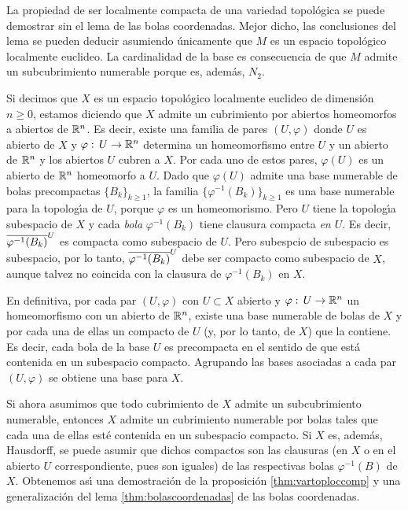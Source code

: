 \begin{remarkVarTopParacompIII}\label{rem:vartopparacompIII}
	La propiedad de ser localmente compacta de una variedad topol\'{o}gica
	se puede demostrar sin el lema de las bolas coordenadas. Mejor dicho,
	las conclusiones del lema se pueden deducir asumiendo \'{u}nicamente
	que $M$ es un espacio topol\'{o}gico localmente euclideo. La
	cardinalidad de la base es consecuencia de que $M$ admite un
	subcubrimiento numerable porque es, adem\'{a}s, $N_{2}$.

	Si decimos que $X$ es un espacio topol\'{o}gico localmente euclideo
	de dimensi\'{o}n $n\geq 0$, estamos diciendo que $X$ admite un
	cubrimiento por abiertos homeomorfos a abiertos de $\mathbb{R}^{n}$.
	Es decir, existe una familia de pares $(U,\varphi)$ donde
	$U$ es abierto de $X$ y $\varphi:\,U\rightarrow\mathbb{R}^{n}$ determina
	un homeomorfismo entre $U$ y un abierto de $\mathbb{R}^{n}$ y los
	abiertos $U$ cubren a $X$. Por cada uno de estos pares,
	$\varphi(U)$ es un abierto de $\mathbb{R}^{n}$ homeomorfo a $U$. Dado
	que $\varphi(U)$ admite una base numerable de bolas precompactas
	$\{B_{k}\}_{k\geq 1}$, la familia $\{\varphi^{-1}(B_{k})\}_{k\geq 1}$
	es una base numerable para la topolog\'{\i}a de $U$, porque $\varphi$
	es un homeomorismo. Pero $U$ tiene la topolog\'{\i}a subespacio
	de $X$ y cada \emph{bola} $\varphi^{-1}(B_{k})$ tiene clausura
	compacta \emph{en $U$}. Es decir, $\overline{\varphi^{-1}(B_{k})}^{U}$
	es compacta como subespacio de $U$. Pero subespcio de subespacio
	es subespacio, por lo tanto, $\overline{\varphi^{-1}(B_{k})}^{U}$ debe ser
	compacto como subespacio de $X$, aunque talvez no coincida con la
	clausura de $\varphi^{-1}(B_{k})$ en $X$.

	En definitiva, por cada par $(U,\varphi)$ con $U\subset X$ abierto
	y $\varphi:\,U\rightarrow\mathbb{R}^{n}$ un homeomorfismo con un abierto
	de $\mathbb{R}^{n}$, existe una base numerable de bolas de $X$ y por
	cada una de ellas un compacto de $U$ (y, por lo tanto, de $X$) que
	la contiene. Es decir, cada bola de la base $U$ es precompacta en
	el sentido de que est\'{a} contenida en un subespacio compacto.
	Agrupando las bases asociadas a cada par $(U,\varphi)$ se obtiene
	una base para $X$.

	Si ahora asumimos que todo cubrimiento de $X$ admite un subcubrimiento
	numerable, entonces $X$ admite un cubrimiento numerable por bolas
	tales que cada una de ellas est\'{e} contenida en un subespacio
	compacto. Si $X$ es, adem\'{a}s, Hausdorff, se puede asumir que
	dichos compactos son las clausuras (en $X$ o en el abierto $U$
	correspondiente, pues son iguales) de las respectivas bolas
	$\varphi^{-1}(B)$ de $X$. Obtenemos as\'{\i} una demostraci\'{o}n
	de la proposici\'{o}n \ref{thm:vartoploccomp} y una generalizaci\'{o}n
	del lema \ref{thm:bolascoordenadas} de las bolas coordenadas.
\end{remarkVarTopParacompIII}

